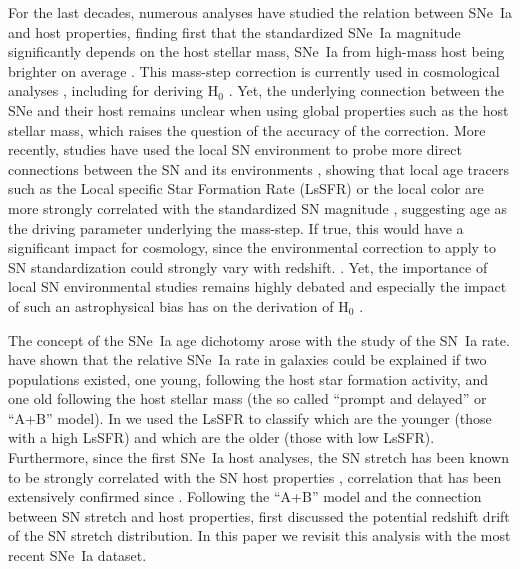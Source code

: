 \documentclass[]{aa} %
\newcommand{\mr}[1]{{\textcolor[rgb]{0.60,0.10,0.6}{#1}}}
\newcommand{\nn}[1]{{\textcolor[rgb]{0.25, 0.50, 0}{#1}}}
\begin{document}
For the last decades, numerous analyses have studied the relation between SNe~Ia
and host properties, finding first that the standardized SNe~Ia magnitude
significantly depends on the host stellar mass, SNe~Ia from high-mass host being
brighter on average \cite[e.g.][]{kelly2010, sullivan2010, childress2013,
betoule2014, rigault2018, kim19}.  This mass-step correction is currently used
in cosmological analyses \citep[e.g.][]{betoule2014, scolnic2018a}, including
for deriving H$_0$ \citep{riess2016, riess2019}. Yet, the underlying connection
between the SNe and their host remains unclear when using global properties such
as the host stellar mass, which raises the question of the accuracy of the
correction. More recently, studies have used the local SN environment to probe
more direct connections between the SN and its environments \citep{rigault2013},
showing that local age tracers such as the Local specific Star Formation Rate
\nn{(LsSFR)} or the local color are more strongly correlated with the standardized
SN magnitude \citep{rigault2018, roman2018, kim18}, suggesting age as the
driving parameter underlying the mass-step. If true, this would have a
significant impact for cosmology, \mr{since the environmental correction to apply to SN standardization could strongly vary with redshift.} \citep{rigault2013, childress2014, scolnic2018a}. Yet, the
importance of local SN environmental studies remains highly debated
\cite[e.g.][]{jones2015, jones2019} and especially the impact \mr{of such an astrophysical bias} has on the derivation of
H$_0$ \citep{jones2015, riess2016, riess2018, rose2019}. 


The concept of the SNe~Ia age dichotomy arose with the study of the SN~Ia rate. 
\cite{mannucci2005, scannapieco2005, sullivan2006, aubourg2008} have
    shown that the relative SNe~Ia rate in galaxies could be explained if two
    populations existed, one young, following the host star formation activity,
    and one old following the host stellar mass (the so called ``prompt and
    delayed'' or ``A+B'' model). In \cite{rigault2018} we used the LsSFR to classify which
    are the younger (those with a high LsSFR) and which are the older (those
    with low LsSFR). Furthermore, since the first SNe~Ia host analyses, the SN
    stretch has been known to be strongly correlated with the SN host properties
    \citep{hamuy1996, hamuy2000}, correlation that has been extensively confirmed since \citep[e.g.][]{neill2009,
sullivan2010, lampeitl2010, kelly2010, gupta2011, dandrea2011, childress2013,
rigault2013, pan2014, kim19}. Following the ``A+B'' model and the connection
between SN stretch and host properties, \cite{howell2007} first discussed the
potential redshift drift of the SN stretch distribution. In this paper we
revisit this analysis with the most recent SNe~Ia dataset.
\end{document}
